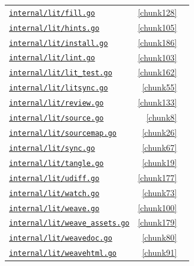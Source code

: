 \documentclass[10pt,a4paper]{article}
\newcounter{chunk}
\begin{document}
\begin{longtable}{@{}p{}rp{}@{}}
\hyperref[chunk128]{\texttt{internal/\allowbreak{}lit/\allowbreak{}fill.\allowbreak{}go}} & \ref*{chunk128} &  \\
\hyperref[chunk105]{\texttt{internal/\allowbreak{}lit/\allowbreak{}hints.\allowbreak{}go}} & \ref*{chunk105} &  \\
\hyperref[chunk186]{\texttt{internal/\allowbreak{}lit/\allowbreak{}install.\allowbreak{}go}} & \ref*{chunk186} &  \\
\hyperref[chunk103]{\texttt{internal/\allowbreak{}lit/\allowbreak{}lint.\allowbreak{}go}} & \ref*{chunk103} &  \\
\hyperref[chunk162]{\texttt{internal/\allowbreak{}lit/\allowbreak{}lit\_\allowbreak{}test.\allowbreak{}go}} & \ref*{chunk162} &  \\
\hyperref[chunk55]{\texttt{internal/\allowbreak{}lit/\allowbreak{}litsync.\allowbreak{}go}} & \ref*{chunk55} &  \\
\hyperref[chunk133]{\texttt{internal/\allowbreak{}lit/\allowbreak{}review.\allowbreak{}go}} & \ref*{chunk133} &  \\
\hyperref[chunk8]{\texttt{internal/\allowbreak{}lit/\allowbreak{}source.\allowbreak{}go}} & \ref*{chunk8} &  \\
\hyperref[chunk26]{\texttt{internal/\allowbreak{}lit/\allowbreak{}sourcemap.\allowbreak{}go}} & \ref*{chunk26} &  \\
\hyperref[chunk67]{\texttt{internal/\allowbreak{}lit/\allowbreak{}sync.\allowbreak{}go}} & \ref*{chunk67} &  \\
\hyperref[chunk19]{\texttt{internal/\allowbreak{}lit/\allowbreak{}tangle.\allowbreak{}go}} & \ref*{chunk19} &  \\
\hyperref[chunk177]{\texttt{internal/\allowbreak{}lit/\allowbreak{}udiff.\allowbreak{}go}} & \ref*{chunk177} &  \\
\hyperref[chunk73]{\texttt{internal/\allowbreak{}lit/\allowbreak{}watch.\allowbreak{}go}} & \ref*{chunk73} &  \\
\hyperref[chunk100]{\texttt{internal/\allowbreak{}lit/\allowbreak{}weave.\allowbreak{}go}} & \ref*{chunk100} &  \\
\hyperref[chunk179]{\texttt{internal/\allowbreak{}lit/\allowbreak{}weave\_\allowbreak{}assets.\allowbreak{}go}} & \ref*{chunk179} &  \\
\hyperref[chunk80]{\texttt{internal/\allowbreak{}lit/\allowbreak{}weavedoc.\allowbreak{}go}} & \ref*{chunk80} &  \\
\hyperref[chunk91]{\texttt{internal/\allowbreak{}lit/\allowbreak{}weavehtml.\allowbreak{}go}} & \ref*{chunk91} &  \\

\end{longtable}
\end{document}
